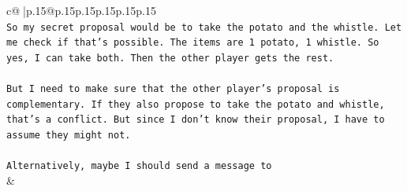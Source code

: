 \documentclass{article}
\begin{document}
{\begin{supertabular}{c@{$\;$}|p{.15\linewidth}@{}p{.15\linewidth}p{.15\linewidth}p{.15\linewidth}p{.15\linewidth}p{.15\linewidth}}
{{{\\ 
\texttt{So my secret proposal would be to take the potato and the whistle. Let me check if that's possible. The items are 1 potato, 1 whistle. So yes, I can take both. Then the other player gets the rest. } \\
\\ 
\texttt{But I need to make sure that the other player's proposal is complementary. If they also propose to take the potato and whistle, that's a conflict. But since I don't know their proposal, I have to assume they might not. } \\
\\ 
\texttt{Alternatively, maybe I should send a message to} \\
            }
        }
    }
    & \\ \\


\end{supertabular}}
\end{document}
